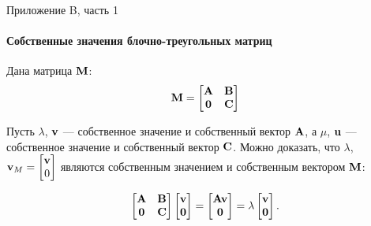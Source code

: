\documentclass{beamer}
\begin{document}
\begin{frame}{Приложение B, часть 1}
	\framesubtitle{Собственные значения блочно-треугольных матриц}
	\begin{flushleft}
		
		Дана матрица $\mathbf{M}$:
		\begin{align}
			\mathbf{M} = 
			\begin{bmatrix}
				\mathbf{A} & \mathbf{B} \\ \mathbf{0} & \mathbf{C}
			\end{bmatrix}
		\end{align}
		
		Пусть $\lambda$, $\mathbf{v}$ — собственное значение и собственный вектор $\mathbf{A}$, а $\mu$, $\mathbf{u}$ — собственное значение и собственный вектор $\mathbf{C}$. Можно доказать, что $\lambda$, $\mathbf{v}_M = \begin{bmatrix}
			\mathbf{v} \\ 0
		\end{bmatrix}$ являются собственным значением и собственным вектором $\mathbf{M}$:
		
		\begin{align}
			\begin{bmatrix}
				\mathbf{A} & \mathbf{B} \\ \mathbf{0} & \mathbf{C}
			\end{bmatrix}
			\begin{bmatrix}
				\mathbf{v} \\ \mathbf{0}
			\end{bmatrix}
			=
			\begin{bmatrix}
				\mathbf{A}\mathbf{v} \\ \mathbf{0}
			\end{bmatrix}
			=
			\lambda
			\begin{bmatrix}
				\mathbf{v} \\ \mathbf{0}
			\end{bmatrix}.
		\end{align}
		
	\end{flushleft}
\end{frame}
\end{document}
